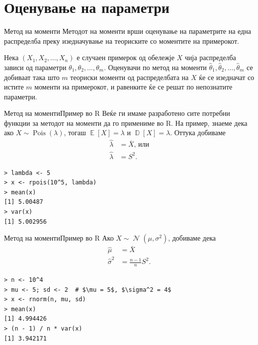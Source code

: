 \documentclass[hyperref={unicode}, xcolor={svgnames, table},
usepdftitle=false]{beamer}
\theoremstyle{remark}
\begin{document}
\section{Оценување на параметри}

\begin{frame}{Метод на моменти}
  Методот на моменти врши оценување на параметрите на една распределба преку
  изедначување на теориските со моментите на примерокот.
  \begin{definition}
    Нека \((X_1, X_2, \ldots, X_n)\) е случаен примерок од обележје \(X\) чија
    распределба зависи од параметри \(\theta_1, \theta_2, \ldots, \theta_m\).
    Оценувачи по метод на моменти
    \(\hat{\theta}_1, \hat{\theta}_2, \ldots, \hat{\theta}_m\) се добиваат така
    што \(m\) теориски моменти од распределбата на \(X\) ќе се изедначат со
    истите \(m\) моменти на примерокот, и равенките ќе се решат по непознатите
    параметри.
  \end{definition}
\end{frame}

\begin{frame}[fragile]{Метод на моменти}{Пример во R}
  Веќе ги имаме разработено сите потребни функции за методот на моменти да го
  примениме во R.  На пример, знаеме дека ако
  \(X \sim \operatorname{Pois}(\lambda)\), тогаш
  \(\operatorname{\mathbb{E}}[X] = \lambda\) и
  \(\operatorname{\mathbb{D}}[X] = \lambda\).  Оттука добиваме
  \begin{align*}
    \hat{\lambda} &= \bar{X}\text{, или}\\
    \hat{\lambda} &= S^2\text{.}
  \end{align*}
\begin{verbatim}
> lambda <- 5
> x <- rpois(10^5, lambda)
> mean(x)
[1] 5.00487
> var(x)
[1] 5.002956
\end{verbatim}
\end{frame}

\begin{frame}[fragile]{Метод на моменти}{Пример во R}
  Ако \(X \sim \operatorname{\mathcal{N}}(\mu, \sigma^2)\), добиваме дека
  \begin{align*}
    \hat{\mu} &= \bar{X} \\
    \hat{\sigma}^2 &= \frac{n - 1}{n} S^2\text{.}
  \end{align*}
\begin{verbatim}
> n <- 10^4
> mu <- 5; sd <- 2  # $\mu = 5$, $\sigma^2 = 4$
> x <- rnorm(n, mu, sd)
> mean(x)
[1] 4.994426
> (n - 1) / n * var(x)
[1] 3.942171
\end{verbatim}
\end{frame}
\end{document}
